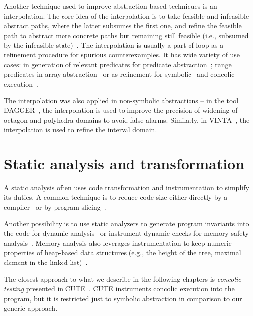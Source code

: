 Another technique used to improve abstraction-based techniques is an
interpolation. The core idea of the interpolation is to take feasible and
infeasible abstract paths, where the latter subsumes the first one, and refine
the feasible path to abstract more concrete paths but remaining still feasible
(i.e., subsumed by the infeasible state)~\cite{Mcmillan2003interpolation}.  The
interpolation is usually a part of \cegar loop as a refinement procedure for
spurious counterexamples. It has wide variety of use cases: in generation of
relevant predicates for predicate abstraction~\cite{Henzinger2004abstractions,
Cimatti2016}; range predicates in array abstraction~\cite{Jhala2007array} or
as refinement for symbolic~\cite{Ibing2016} and concolic execution~\cite{Jaffar2013}.

The interpolation was also applied in non-symbolic abstractions -- in the tool
DAGGER~\cite{Gulavani2008}, the interpolation is used to improve the precision
of widening of octagon and polyhedra domains to avoid false alarms. Similarly,
in VINTA~\cite{Albarghouthi2012}, the interpolation is used to refine the interval domain.

\section{Static analysis and transformation}

A static analysis often uses code transformation and instrumentation to
simplify its duties. A common technique is to reduce code size either directly
by a compiler~\cite{Namjoshi2018} or by program slicing~\cite{Chalupa2018}.

Another possibility is to use static analyzers to generate program invariants into the code for dynamic analysis~\cite{Gurfinkel2015} or instrument dynamic checks for memory safety analysis~\cite{Chalupa2019}.
Memory analysis also leverages instrumentation to keep numeric properties of heap-based data structures (e.g., the height of the tree, maximal element in the linked-list)~\cite{Magill2010}.

The closest approach to what we describe in the following chapters is
\emph{concolic testing} presented in CUTE~\cite{Sen2005}. CUTE instruments concolic
execution into the program, but it is restricted just to symbolic abstraction
in comparison to our generic approach.
